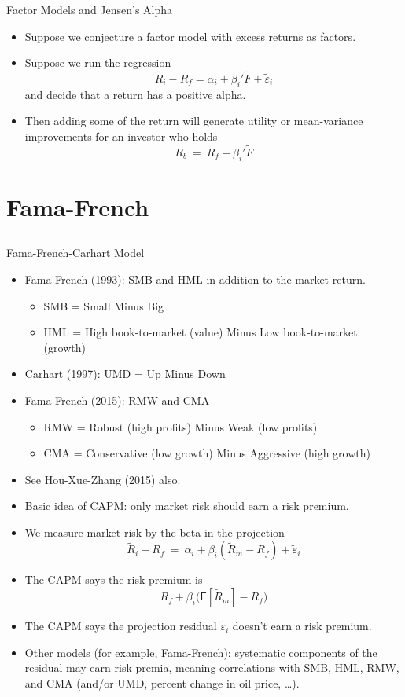 \documentclass[10pt]{beamer}
\newcommand{\bi}{\begin{itemize}}
\newcommand{\ei}{\end{itemize}}
\newcommand{\im}{\item}
\newcommand{\mye}{\ensuremath{\mathsf{E}}}
\newcommand{\bfr}{\begin{frame}}
\newcommand{\tve}{\tilde{\varepsilon}}
\newcommand{\tF}{\tilde{F}}
\newcommand{\tr}{\widetilde{R}}
\begin{document}

\begin{frame}{Factor Models and Jensen's Alpha}
\bi 
\im Suppose we conjecture a factor model with excess returns as factors.

\im Suppose we run the regression
$$\tr_i - R_f = \alpha_i + \beta_i'\tF + \tve_i$$
and decide that a return has a positive alpha.

\im Then adding some of the return will generate utility or mean-variance improvements for an investor who holds 
$$R_b \ = \ R_f + \beta_i'\tF$$
\ei 
\end{frame}


\section{Fama-French}\subsection{}

\bfr{Fama-French-Carhart Model}
\bi 
 \im Fama-French (1993): SMB and HML in addition to the market return.
\bi
\im SMB = Small Minus Big
\im HML = High book-to-market (value) Minus Low book-to-market (growth)
\ei

\im Carhart (1997): UMD = Up Minus Down

\im Fama-French (2015): RMW and CMA
\bi
\im RMW = Robust (high profits) Minus Weak (low profits)
\im CMA = Conservative (low growth) Minus Aggressive (high growth)
\ei

\im See Hou-Xue-Zhang (2015) also.
\ei 
\end{frame}

\begin{frame}
\bi 
\im Basic idea of CAPM: only market risk should earn a risk premium.  \im We measure market risk by the beta in the projection
$$\tr_i - R_f \ = \ \alpha_i + \beta_i(\tr_m-R_f) + \tve_i$$
\im The CAPM says the risk premium is
$$R_f + \beta_i\big(\mye[\tr_m]-R_f\big)$$
\im The CAPM says the projection residual $\tve_i$ doesn't earn a risk premium.

\im Other models (for example, Fama-French): systematic components of the  residual may earn risk premia, meaning correlations with SMB, HML, RMW, and CMA (and/or UMD, percent change in oil price, \ldots).
\ei 
\end{frame}
\end{document}
